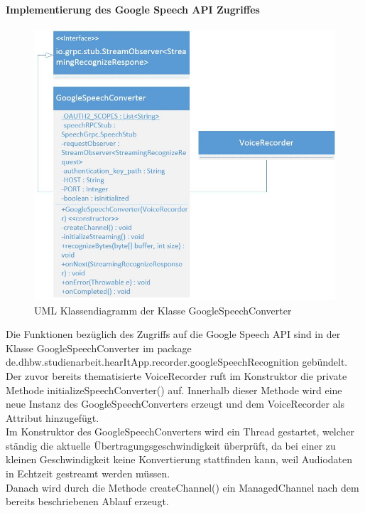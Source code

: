 \paragraph{Implementierung des Google Speech API Zugriffes}
\begin{figure}
	\includegraphics[width=\linewidth]{../images/GoogleSpeechConverter.JPG}
	\caption{UML Klassendiagramm der Klasse GoogleSpeechConverter}
	\label{fig:GoogleSpeechConverter}
\end{figure}
Die Funktionen bezüglich des Zugriffs auf die Google Speech API sind in der Klasse GoogleSpeechConverter im package de.dhbw.studienarbeit.hearItApp.recorder.googleSpeechRecognition gebündelt.
Der zuvor bereits thematisierte VoiceRecorder ruft im Konstruktor die private Methode initializeSpeechConverter() auf. 
Innerhalb dieser Methode wird eine neue Instanz des GoogleSpeechConverters erzeugt und dem VoiceRecorder als Attribut hinzugefügt.\\
Im Konstruktor des GoogleSpeechConverters wird ein Thread gestartet, welcher ständig die aktuelle Übertragungsgeschwindigkeit überprüft, da bei einer zu kleinen Geschwindigkeit keine Konvertierung stattfinden kann, weil Audiodaten in Echtzeit gestreamt werden müssen.\\
Danach wird durch die Methode createChannel() ein ManagedChannel nach dem bereits beschriebenen Ablauf erzeugt.
